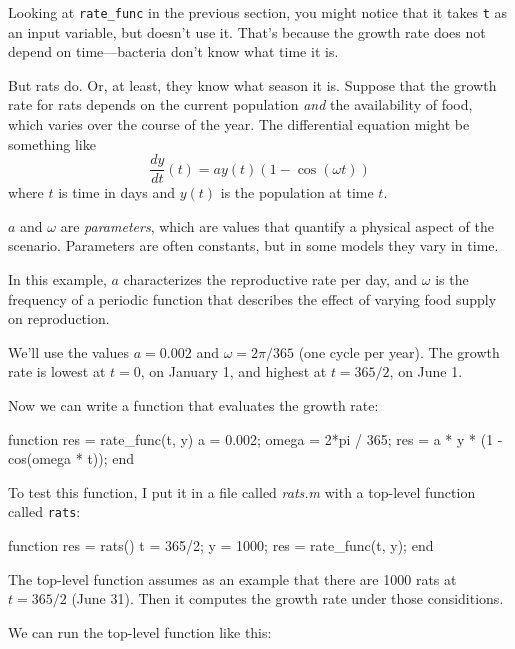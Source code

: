 Looking at \verb"rate_func" in the previous section, you might notice that it takes {\tt t} as an input variable, but doesn't use it.  That's because the growth rate does not depend on time---bacteria don't know what time it is.


But rats do.  Or, at least, they know what season it is.
Suppose that the growth rate for rats depends on the current population {\em and} the availability of food, which varies over the course of the year.
The differential equation might be something like
%
\begin{equation}
\frac{dy}{dt}(t) = a y(t) \left(1 - \cos (\omega t) \right)
\end{equation}
%
where $t$ is time in days and $y(t)$ is the population at time $t$.

$a$ and $\omega$ are {\em parameters}, which are values that
quantify a physical aspect of the scenario.  Parameters are often constants, but in some models they vary in time.


In this example, $a$ characterizes the reproductive rate per day, and
$\omega$ is the frequency of a periodic function that describes
the effect of varying food supply on reproduction.

We'll use the values $a = 0.002$
and $\omega = 2 \pi/365$ (one cycle per year).
The growth rate is lowest at $t=0$, on January 1, and highest at $t=365/2$, on June 1.

Now we can write a function that evaluates the growth rate:

\begin{code}
function res = rate_func(t, y)
    a = 0.002;
    omega = 2*pi / 365;
    res = a * y * (1 - cos(omega * t));
end
\end{code}

To test this function, I put it in a file called {\em rats.m} with a top-level function called 
{\tt rats}:

\begin{code}
function res = rats()
    t = 365/2;
    y = 1000;
    res = rate_func(t, y);
end
\end{code}

The top-level function assumes as an example that
there are 1000 rats at $t=365/2$ (June 31).  Then it computes the growth rate under those considitions.

We can run the top-level function like this:

